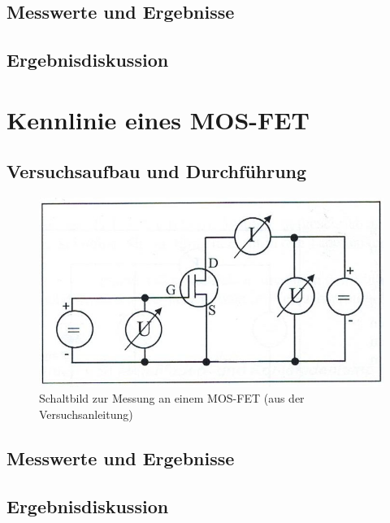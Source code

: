 \documentclass{scrartcl}
\begin{document}
\subsection{Messwerte und Ergebnisse}

\subsection{Ergebnisdiskussion}




\pagebreak
\section{Kennlinie eines MOS-FET}
\subsection{Versuchsaufbau und Durchführung}

\begin{figure}[H]
  \centering
    \includegraphics[scale=0.75]{Aufbau4.JPG}
  \caption{Schaltbild zur Messung an einem MOS-FET (aus der Versuchsanleitung)}
  \label{fig:Aufbau4}
\end{figure}

\subsection{Messwerte und Ergebnisse}

\subsection{Ergebnisdiskussion}
\end{document}
